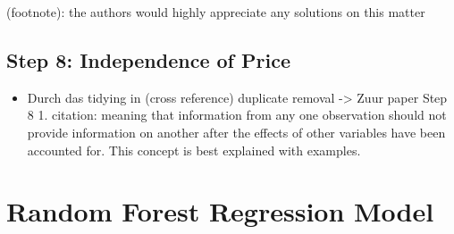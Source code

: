 \documentclass[a4paper, nobind]{templates/ociamthesis}
\providecommand{\tightlist}{%
  \setlength{\itemsep}{0pt}\setlength{\parskip}{0pt}}
\begin{document}
(footnote): the authors would highly appreciate any solutions on this matter

\hypertarget{step-8-independence-of-price}{%
\subsection{Step 8: Independence of Price}\label{step-8-independence-of-price}}

\begin{itemize}
\tightlist
\item
  Durch das tidying in (cross reference) duplicate removal -\textgreater{} Zuur paper Step 8 1. citation: meaning that information from any one observation should not provide information on another after the effects of other variables have been accounted for. This concept is best explained with examples.
\end{itemize}

\hypertarget{random_forest_model}{%
\section{Random Forest Regression Model}\label{random_forest_model}}
\end{document}

